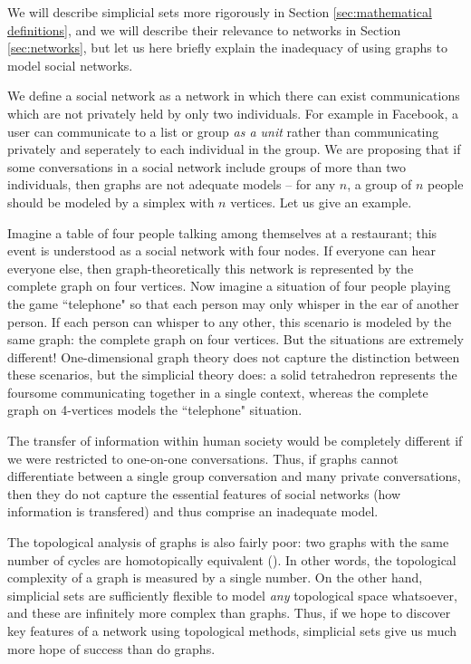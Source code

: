 \documentclass{amsart}
\begin{document}
We will describe simplicial sets more rigorously in Section \ref{sec:mathematical definitions}, and we will describe their relevance to networks in Section \ref{sec:networks}, but let us here briefly explain the inadequacy of using graphs to model social networks.  

We define a social network as a network in which there can exist communications which are not privately held by only two individuals.  For example in Facebook, a user can communicate to a list or group {\em as a unit} rather than communicating privately and seperately to each individual in the group.  We are proposing that if some conversations in a social network include groups of more than two individuals, then graphs are not adequate models -- for any $n$, a group of $n$ people should be modeled by a simplex with $n$ vertices.  Let us give an example.

Imagine a table of four people talking among themselves at a restaurant; this event is understood as a social network with four nodes.  If everyone can hear everyone else, then graph-theoretically this network is represented by the complete graph on four vertices.  Now imagine a situation of four people playing the game ``telephone" so that each person may only whisper in the ear of another person.  If each person can whisper to any other, this scenario is modeled by the same graph: the complete graph on four vertices.  But the situations are extremely different!  One-dimensional graph theory does not capture the distinction between these scenarios, but the simplicial theory does: a solid tetrahedron represents the foursome communicating together in a single context, whereas the complete graph on 4-vertices models the ``telephone" situation.  

The transfer of information within human society would be completely different if we were restricted to one-on-one conversations.  Thus, if graphs cannot differentiate between a single group conversation and many private conversations, then they do not capture the essential features of social networks (how information is transfered) and thus comprise an inadequate model.   

The topological analysis of graphs is also fairly poor: two graphs with the same number of cycles are homotopically equivalent (\cite{}).  In other words, the topological complexity of a graph is measured by a single number.  On the other hand, simplicial sets are sufficiently flexible to model {\em any} topological space whatsoever, and these are infinitely more complex than graphs.  Thus, if we hope to discover key features of a network using topological methods, simplicial sets give us much more hope of success than do graphs.
\end{document}
